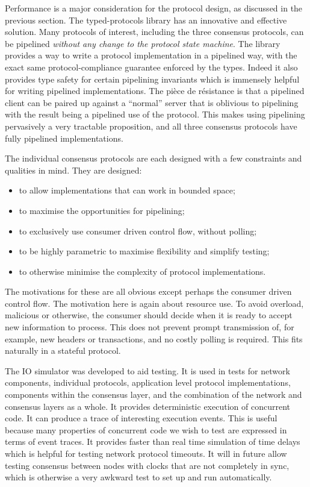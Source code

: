 \documentclass[11pt,a4paper]{article}
\begin{document}
Performance is a major consideration for the protocol design, as
discussed in the previous section. The typed-protocols library has an
innovative and effective solution. Many protocols of interest, including
the three consensus protocols, can be pipelined \emph{without any change
to the protocol state machine}. The library provides a way to write a
protocol implementation in a pipelined way, with the exact same
protocol-compliance guarantee enforced by the types. Indeed it also
provides type safety for certain pipelining invariants which is
immensely helpful for writing pipelined implementations. The pièce de
résistance is that a pipelined client can be paired up against a
``normal'' server that is oblivious to pipelining with the result being
a pipelined use of the protocol. This makes using pipelining pervasively
a very tractable proposition, and all three consensus protocols have
fully pipelined implementations.

The individual consensus protocols are each designed with a few
constraints and qualities in mind. They are designed:

\begin{itemize}
\item
  to allow implementations that can work in bounded space;
\item
  to maximise the opportunities for pipelining;
\item
  to exclusively use consumer driven control flow, without polling;
\item
  to be highly parametric to maximise flexibility and simplify testing;
\item
  to otherwise minimise the complexity of protocol implementations.
\end{itemize}

The motivations for these are all obvious except perhaps the consumer
driven control flow. The motivation here is again about resource use. To
avoid overload, malicious or otherwise, the consumer should decide when
it is ready to accept new information to process. This does not prevent
prompt transmission of, for example, new headers or transactions, and no
costly polling is required. This fits naturally in a stateful protocol.

The IO simulator was developed to aid testing. It is used in tests for
network components, individual protocols, application level protocol
implementations, components within the consensus layer, and the
combination of the network and consensus layers as a whole. It provides
deterministic execution of concurrent code. It can produce a trace of
interesting execution events. This is useful because many properties of
concurrent code we wish to test are expressed in terms of event traces.
It provides faster than real time simulation of time delays which is
helpful for testing network protocol timeouts. It will in future allow
testing consensus between nodes with clocks that are not completely in
sync, which is otherwise a very awkward test to set up and run
automatically.
\end{document}
